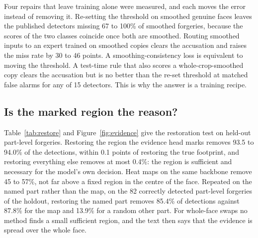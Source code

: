 \documentclass[conference,a4paper]{IEEEtran}
\begin{document}
Four repairs that leave training alone were measured, and each moves the error instead of removing it. Re-setting the
threshold on smoothed genuine faces leaves the published detectors missing 67 to 100\% of smoothed forgeries, because the scores
of the two classes coincide once both are smoothed. Routing smoothed inputs to an expert trained on smoothed copies clears the
accusation and raises the miss rate by 30 to 46 points. A smoothing-consistency loss is equivalent to moving the threshold. A
test-time rule that also scores a whole-crop-smoothed copy clears the accusation but is no better than the re-set threshold at
matched false alarms for any of 15 detectors. This is why the answer is a training recipe.

\subsection{Is the marked region the reason?}
\label{sec:res-evidence}

Table~\ref{tab:restore} and Figure~\ref{fig:evidence} give the restoration test on held-out part-level forgeries. Restoring the
region the evidence head marks removes 93.5 to 94.0\% of the detections, within 0.1 points of restoring the true footprint,
and restoring everything else removes at most 0.4\%: the region is sufficient and necessary for the model's own decision.
Heat maps on the same backbone remove 45 to 57\%, not far above a fixed region in the centre of the face. Repeated on the
named part rather than the map, on the 82 correctly detected part-level forgeries of the holdout, restoring the named part
removes 85.4\% of detections against 87.8\% for the map and 13.9\% for a random other part. For whole-face swaps no method
finds a small sufficient region, and the text then says that the evidence is spread over the whole face.
\end{document}
